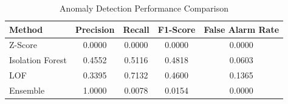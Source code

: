 \begin{table}[h]
\centering
\caption{Anomaly Detection Performance Comparison}
\label{tab:anomaly_comparison}
\begin{tabular}{lcccc}
\hline
\textbf{Method} & \textbf{Precision} & \textbf{Recall} & \textbf{F1-Score} & \textbf{False Alarm Rate} \\
\hline
Z-Score & 0.0000 & 0.0000 & 0.0000 & 0.0000 \\
Isolation Forest & 0.4552 & 0.5116 & 0.4818 & 0.0603 \\
LOF & 0.3395 & 0.7132 & 0.4600 & 0.1365 \\
Ensemble & 1.0000 & 0.0078 & 0.0154 & 0.0000 \\
\hline
\end{tabular}
\end{table}